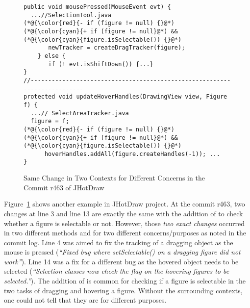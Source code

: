 \begin{figure}[t]
	\centering
	\begin{lstlisting}[]
public void mousePressed(MouseEvent evt) { 
  ...//SelectionTool.java
(*@{\color{red}{- if (figure != null) {}@*)
(*@{\color{cyan}{+ if (figure != null}@*) && (*@{\color{cyan}{figure.isSelectable()) {}@*)
       newTracker = createDragTracker(figure);
    } else {
       if (! evt.isShiftDown()) {...}
}
//--------------------------------------------------------------------------
protected void updateHoverHandles(DrawingView view, Figure f) {
  ...// SelectAreaTracker.java
  figure = f;
(*@{\color{red}{- if (figure != null) {}@*)
(*@{\color{cyan}{+ if (figure != null}@*) && (*@{\color{cyan}{figure.isSelectable()) {}@*)
      hoverHandles.addAll(figure.createHandles(-1)); ...
}
	\end{lstlisting}
        \vspace{-15pt}
        \caption{Same Change in Two Contexts for Different Concerns in the Commit r463 of JHotDraw}
        \vspace{-6pt}
        \label{fig:motiv-context}
\end{figure}

Figure~\ref{fig:motiv-context} shows another example in JHotDraw
project. At the commit r463, two changes at line 3 and line 13 are
exactly the same with the addition of  to
check whether a figure is selectable or not. However, those {\em two
  exact changes} occurred in two different methods 
and  for two different concerns/purposes as
noted in the commit log. Line 4 was aimed to fix the tracking of a
dragging object as the mouse is pressed ({\em ``Fixed bug where
  setSelectable() on a dragging figure did not work''}).  Line 14 was
a fix for a different bug as the hovered object needs to be selected
({\em ``Selection classes now check the flag on the hovering figures
  to be selected.''}). The addition of  is
common for checking if a figure is selectable in the two tasks of
dragging and hovering a figure. Without the surrounding contexts,
one could not tell that they are for different purposes.

